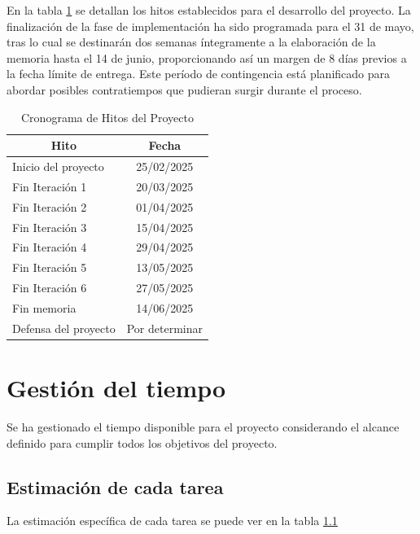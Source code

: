 En la tabla \ref{tab:hitos} se detallan los hitos establecidos para el desarrollo del proyecto. La finalización de la fase de implementación ha sido programada para el 31 de mayo, tras lo cual se destinarán dos semanas íntegramente a la elaboración de la memoria hasta el 14 de junio, proporcionando así un margen de 8 días previos a la fecha límite de entrega. Este período de contingencia está planificado para abordar posibles contratiempos que pudieran surgir durante el proceso.


\begin{table}[H]\centering
\begin{tabular}{|l|c|}
\hline
\multicolumn{1}{|c|}{\textbf{Hito}} & \multicolumn{1}{c|}{\textbf{Fecha}} \\
\hline
Inicio del proyecto & 25/02/2025 \\
\hline
Fin Iteración 1 & 20/03/2025 \\
\hline
Fin Iteración 2 & 01/04/2025 \\
\hline
Fin Iteración 3 & 15/04/2025 \\
\hline
Fin Iteración 4 & 29/04/2025 \\
\hline
Fin Iteración 5 & 13/05/2025 \\
\hline
Fin Iteración 6 & 27/05/2025 \\
\hline
Fin memoria & 14/06/2025 \\
\hline
Defensa del proyecto & Por determinar \\
\hline
\end{tabular}
\caption{Cronograma de Hitos del Proyecto}
\label{tab:hitos}
\end{table}

\section{Gestión del tiempo}
Se ha gestionado el tiempo disponible para el proyecto considerando el alcance definido para cumplir todos los objetivos del proyecto. 

\subsection{Estimación de cada tarea}
La estimación específica de cada tarea se puede ver en la tabla \ref{}

